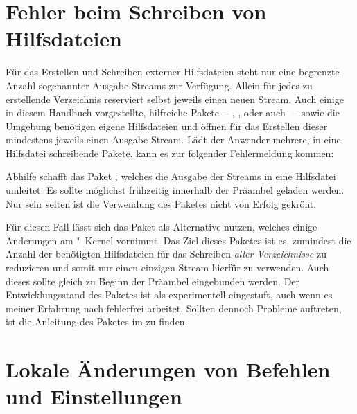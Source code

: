\section{%
  Fehler beim Schreiben von Hilfsdateien%
  \label{sec:tips:write}%
}

%
Für das Erstellen und Schreiben externer Hilfsdateien steht  
nur eine begrenzte Anzahl sogenannter Ausgabe-Streams zur Verfügung. Allein für 
jedes zu erstellende Verzeichnis reserviert  selbst jeweils 
einen neuen Stream. Auch einige in diesem Handbuch vorgestellte, hilfreiche 
Pakete~-- , ,  oder 
auch ~-- sowie die Umgebung 
benötigen eigene Hilfsdateien und öffnen für das Erstellen dieser mindestens 
jeweils einen Ausgabe-Stream. Lädt der Anwender mehrere, in eine Hilfsdatei 
schreibende Pakete, kann es zur folgender Fehlermeldung kommen:
%
\begin{quoting}
\end{quoting}
%
Abhilfe schafft das Paket , welches die Ausgabe der Streams 
in eine Hilfsdatei umleitet. Es sollte möglichst frühzeitig innerhalb der 
Präambel geladen werden. Nur sehr selten ist die Verwendung des Paketes nicht 
von Erfolg gekrönt. 

Für diesen Fall lässt sich das Paket  als Alternative nutzen, 
welches einige Änderungen am "~Kernel vornimmt. Das Ziel 
dieses Paketes ist es, zumindest die Anzahl der benötigten Hilfsdateien für das 
Schreiben \emph{aller Verzeichnisse} zu reduzieren und somit nur einen einzigen 
Stream hierfür zu verwenden. Auch dieses sollte gleich zu Beginn der Präambel 
eingebunden werden. Der Entwicklungsstand des Paketes ist als experimentell 
eingestuft, auch wenn es meiner Erfahrung nach fehlerfrei arbeitet. Sollten 
dennoch Probleme auftreten, ist die Anleitung des Paketes im \scrguide zu 
finden. 



\section{%
  Lokale Änderungen von Befehlen und Einstellungen%
  \label{sec:tips:local}%
}

